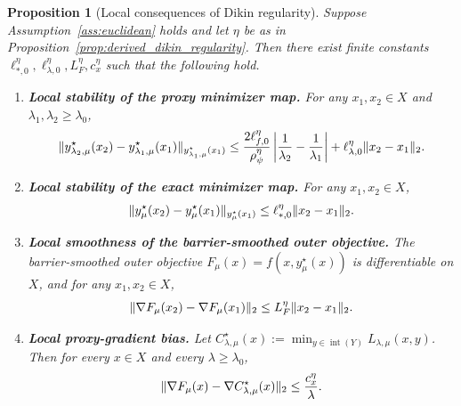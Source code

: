 \documentclass{article}
\newtheorem{proposition}{Proposition}
\begin{document}
\begin{proposition}[Local consequences of Dikin regularity]
\label{prop:local_consequences}
Suppose Assumption~\ref{ass:euclidean} holds and let \(\eta\) be as in
Proposition~\ref{prop:derived_dikin_regularity}. Then there exist finite constants
\(\ell_{\ast,0}^\eta,\ell_{\lambda,0}^\eta,L_F^\eta,c_x^\eta\) such that the following hold.

\begin{enumerate}[leftmargin=*]
    \item[\textup{(i)}] \textbf{Local stability of the proxy minimizer map.}
    For any \(x_1,x_2\in X\) and  \(\lambda_1,\lambda_2\ge \lambda_0\),
    \begin{equation}\label{eq:prop_local_proxy}
    \|y_{\lambda_2,\mu}^\star(x_2)-y_{\lambda_1,\mu}^\star(x_1)\|_{y_{\lambda_1,\mu}^\star(x_1)}
    \le
    \frac{2\ell_{f,0}^\eta}{\rho_{\psi}^\eta}
    \left|\frac{1}{\lambda_2}-\frac{1}{\lambda_1}\right|
    +
    \ell_{\lambda,0}^\eta \|x_2-x_1\|_2. \notag
    \end{equation}
    \item[\textup{(ii)}] \textbf{Local stability of the exact minimizer map.}
    For any \(x_1,x_2\in X\),
    \begin{equation}\label{eq:prop_local_exact}
    \|y_\mu^\star(x_2)-y_\mu^\star(x_1)\|_{y_\mu^\star(x_1)}
    \le
    \ell_{\ast,0}^\eta \|x_2-x_1\|_2. \notag
    \end{equation}

    \item[\textup{(iii)}] \textbf{Local smoothness of the barrier-smoothed outer objective.}
    The barrier-smoothed outer objective \(F_\mu(x)=f(x,y_\mu^\star(x))\) is differentiable on \(X\), and for any \(x_1,x_2\in X\),
    \begin{equation}\label{eq:prop_local_smooth}
    \|\nabla F_\mu(x_2)-\nabla F_\mu(x_1)\|_2
    \le
    L_F^\eta \|x_2-x_1\|_2. \notag
    \end{equation}

    \item[\textup{(iv)}] \textbf{Local proxy-gradient bias.}
    Let \(C_{\lambda,\mu}^\star(x):=\min_{y\in\operatorname{int}(Y)} L_{\lambda,\mu}(x,y)\).
    Then for every \(x\in X\) and every \(\lambda\ge \lambda_0\),
    \begin{equation}\label{eq:prop_local_bias}
    \|\nabla F_\mu(x)-\nabla C_{\lambda,\mu}^\star(x)\|_2
    \le
    \frac{c_x^\eta}{\lambda}. \notag
    \end{equation}
\end{enumerate}
\end{proposition}
\end{document}
